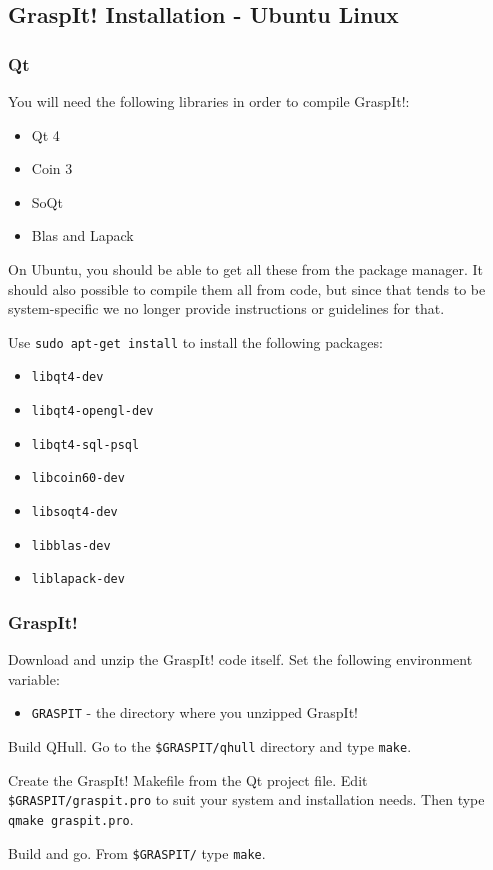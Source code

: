 \subsection{GraspIt! Installation - Ubuntu Linux}

\subsubsection{Qt}

You will need the following libraries in order to compile GraspIt!:
\begin{itemize}
\item Qt 4
\item Coin 3
\item SoQt
\item Blas and Lapack
\end{itemize}

On Ubuntu, you should be able to get all these from the package
manager. It should also possible to compile them all from code, but
since that tends to be system-specific we no longer provide
instructions or guidelines for that.

Use \texttt{sudo apt-get install} to install the following packages:
\begin{itemize}
\item \texttt{libqt4-dev}
\item \texttt{libqt4-opengl-dev}
\item \texttt{libqt4-sql-psql}
\item \texttt{libcoin60-dev}
\item \texttt{libsoqt4-dev}
\item \texttt{libblas-dev}
\item \texttt{liblapack-dev}
\end{itemize}

\subsubsection{GraspIt!}

Download and unzip the GraspIt! code itself. Set the following
environment variable:

\begin{itemize}
\item \texttt{GRASPIT} - the directory where you unzipped GraspIt!
\end{itemize}

Build QHull. Go to the \texttt{\$GRASPIT/qhull} directory and type
\texttt{make}.

Create the GraspIt! Makefile from the Qt project file. Edit
\texttt{\$GRASPIT/graspit.pro} to suit your system and
installation needs. Then type \texttt{qmake graspit.pro}.

Build and go. From \texttt{\$GRASPIT/} type \texttt{make}.

